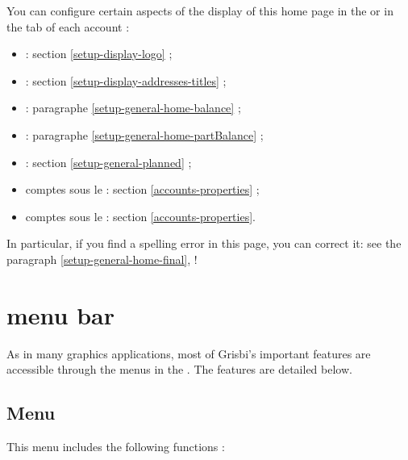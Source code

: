 You can configure certain aspects of the display of this home page in the  or in the  tab of each account :
\begin{itemize}
	 \item {} : section \vref{setup-display-logo} ;
	 \item {} : section \vref{setup-display-addresses-titles} ;
	 \item {} : paragraphe \vref{setup-general-home-balance} ;
	 \item {} : paragraphe \vref{setup-general-home-partBalance} ;
	 \item {} : section \vref{setup-general-planned} ;
	 \item comptes sous le  : section \vref{accounts-properties} ;
	 \item comptes sous le  : section  \vref{accounts-properties}.
\end{itemize}

In particular, if you find a spelling error in this page, you can correct it: see the paragraph \vref{setup-general-home-final},  !

\ifIllustration
\newpage
\fi

\section{menu bar\label{home-menus}}

As in many graphics applications, most of Grisbi's important features are accessible through the menus in the . The features are detailed below.


\subsection{Menu \label{home-menus-file}}

This menu includes the following functions :



